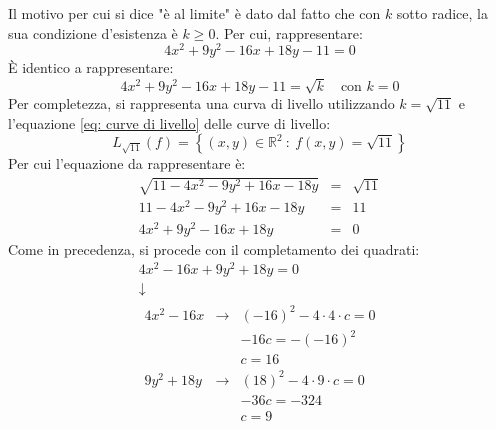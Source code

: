 \documentclass[a4paper]{article}
\begin{document}
	\noindent
	Il motivo per cui si dice "è al limite" è dato dal fatto che con $k$ sotto radice, la sua condizione d'esistenza è $k\ge 0$. Per cui, rappresentare:
	\begin{equation*}
		4x^{2}+9y^{2}-16x+18y-11 = 0
	\end{equation*}
	È identico a rappresentare:
	\begin{equation*}
		4x^{2}+9y^{2}-16x+18y-11 = \sqrt{k} \hspace{1em} \text{con } k = 0
	\end{equation*}
	Per completezza, si rappresenta una curva di livello utilizzando $k = \sqrt{11}$ e l'equazione \ref{eq: curve di livello} delle curve di livello:
	\begin{equation*}
		L_{\sqrt{11}}\left(f\right) = \left\{\left(x,y\right) \in \mathbb{R}^{2} \: : \: f\left(x,y\right) = \sqrt{11}\right\}
	\end{equation*}
	Per cui l'equazione da rappresentare è:
	\begin{equation*}
		\begin{array}{rcl}
			\sqrt{11 - 4x^{2} - 9y^{2} + 16x - 18y} &=& \sqrt{11} \\ [.3em]
			11 - 4x^{2} - 9y^{2} + 16x - 18y &=& 11 \\ [.3em]
			4x^{2} + 9y^{2} - 16x + 18y &=& 0
		\end{array}
	\end{equation*}
	Come in precedenza, si procede con il completamento dei quadrati:
	\begin{gather*}
		4x^{2} - 16x + 9y^{2} + 18y = 0 \\
		\downarrow \\
		\begin{array}{rcl}
			4x^{2} - 16x &\rightarrow& \left(-16\right)^{2} - 4 \cdot 4 \cdot c = 0 \\ [.3em]
									&& -16c = -\left(-16\right)^{2} \\ [.3em]
									&& c = 16 \\ [1em]
			9y^{2} + 18y &\rightarrow& \left(18\right)^{2} - 4 \cdot 9 \cdot c = 0 \\ [.3em]
									&& -36c = -324 \\ [.3em]
									&& c = 9
		\end{array}
	\end{gather*}
\end{document}
